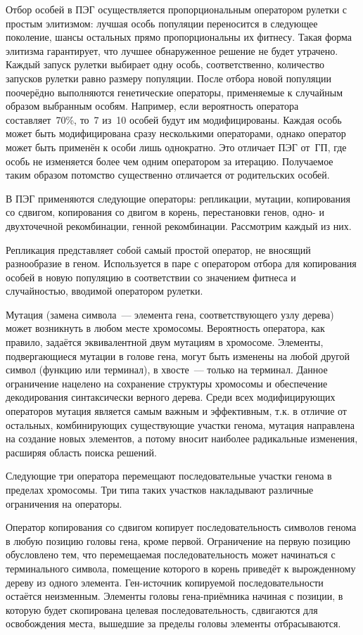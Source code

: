 Отбор особей в ПЭГ осуществляется пропорциональным оператором рулетки с простым элитизмом: лучшая особь популяции переносится в следующее поколение, шансы остальных прямо пропорциональны их фитнесу. Такая форма элитизма гарантирует, что лучшее обнаруженное решение не будет утрачено. Каждый запуск рулетки выбирает одну особь, соответственно, количество запусков рулетки равно размеру популяции.
После отбора новой популяции поочерёдно выполняются генетические операторы, применяемые к случайным образом выбранным особям. Например, если вероятность оператора составляет~70\%, то~7 из~10 особей будут им модифицированы. Каждая особь может быть модифицирована сразу несколькими операторами, однако оператор может быть применён к особи лишь однократно. Это отличает ПЭГ от~ГП, где особь не изменяется более чем одним оператором за итерацию. Получаемое таким образом потомство существенно отличается от родительских особей.

В ПЭГ применяются следующие операторы: репликации, мутации, копирования со сдвигом, копирования со двигом в корень, перестановки генов, одно- и двухточечной рекомбинации, генной рекомбинации. Рассмотрим каждый из них.

Репликация представляет собой самый простой оператор, не вносящий разнообразие в геном. Используется в паре с оператором отбора для копирования особей в новую популяцию в соответствии со значением фитнеса и случайностью, вводимой оператором рулетки.

Мутация (замена символа~--- элемента гена, соответствующего узлу дерева) может возникнуть в любом месте хромосомы. Вероятность оператора, как правило, задаётся эквивалентной двум мутациям в хромосоме. Элементы, подвергающиеся мутации в голове гена, могут быть изменены на любой другой символ (функцию или терминал), в хвосте~--- только на терминал. Данное ограничение нацелено на сохранение структуры хромосомы и обеспечение декодирования синтаксически верного дерева. Среди всех модифицирующих операторов мутация является самым важным и эффективным, т.к. в отличие от остальных, комбинирующих существующие участки генома, мутация направлена на создание новых элементов, а потому вносит наиболее радикальные изменения, расширяя область поиска решений.

Следующие три оператора перемещают последовательные участки генома в пределах хромосомы. Три типа таких участков накладывают различные ограничения на операторы.

Оператор копирования со сдвигом копирует последовательность символов генома в любую позицию головы гена, кроме первой. Ограничение на первую позицию обусловлено тем, что перемещаемая последовательность может начинаться с терминального символа, помещение которого в корень приведёт к вырожденному дереву из одного элемента. Ген-источник копируемой последовательности остаётся неизменным. Элементы головы гена-приёмника начиная с позиции, в которую будет скопирована целевая последовательность, сдвигаются для освобождения места, вышедшие за пределы головы элементы отбрасываются.

